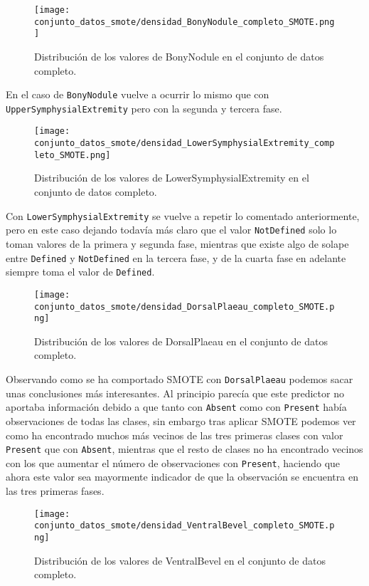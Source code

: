 \begin{figure}[H]
	\centering
	\texttt{[image: conjunto\_datos\_smote/densidad\_BonyNodule\_completo\_SMOTE.png]}
	\caption{Distribución de los valores de BonyNodule en el conjunto de datos completo.}
	\label{fig:densidad_BonyNodule_completo_smote}
\end{figure}

En el caso de \texttt{BonyNodule} vuelve a ocurrir lo mismo que con \texttt{UpperSymphysialExtremity} pero con la segunda y tercera fase.


\begin{figure}[H]
	\centering
	\texttt{[image: conjunto\_datos\_smote/densidad\_LowerSymphysialExtremity\_completo\_SMOTE.png]}
	\caption{Distribución de los valores de LowerSymphysialExtremity en el conjunto de datos completo.}
	\label{fig:densidad_LowerSymphysialExtremity_completo_smote}
\end{figure}

Con \texttt{LowerSymphysialExtremity} se vuelve a repetir lo comentado anteriormente, pero en este caso dejando todavía más claro que el valor \texttt{NotDefined} solo lo toman valores de la primera y segunda fase, mientras que existe algo de solape entre \texttt{Defined} y \texttt{NotDefined} en la tercera fase, y de la cuarta fase en adelante siempre toma el valor de \texttt{Defined}.

\begin{figure}[H]
	\centering
	\texttt{[image: conjunto\_datos\_smote/densidad\_DorsalPlaeau\_completo\_SMOTE.png]}
	\caption{Distribución de los valores de DorsalPlaeau en el conjunto de datos completo.}
	\label{fig:densidad_DorsalPlaeau_completo_smote}
\end{figure}

Observando como se ha comportado SMOTE con \texttt{DorsalPlaeau} podemos sacar unas conclusiones más interesantes. Al principio parecía que este predictor no aportaba información debido a que tanto con \texttt{Absent} como con \texttt{Present} había observaciones de todas las clases, sin embargo tras aplicar SMOTE podemos ver como ha encontrado muchos más vecinos de las tres primeras clases con valor \texttt{Present} que con \texttt{Absent}, mientras que el resto de clases no ha encontrado vecinos con los que aumentar el número de observaciones con \texttt{Present}, haciendo que ahora este valor sea mayormente indicador de que la observación se encuentra en las tres primeras fases.

\begin{figure}[H]
	\centering
	\texttt{[image: conjunto\_datos\_smote/densidad\_VentralBevel\_completo\_SMOTE.png]}
	\caption{Distribución de los valores de VentralBevel en el conjunto de datos completo.}
	\label{fig:densidad_VentralBevel_completo_smote}
\end{figure}

